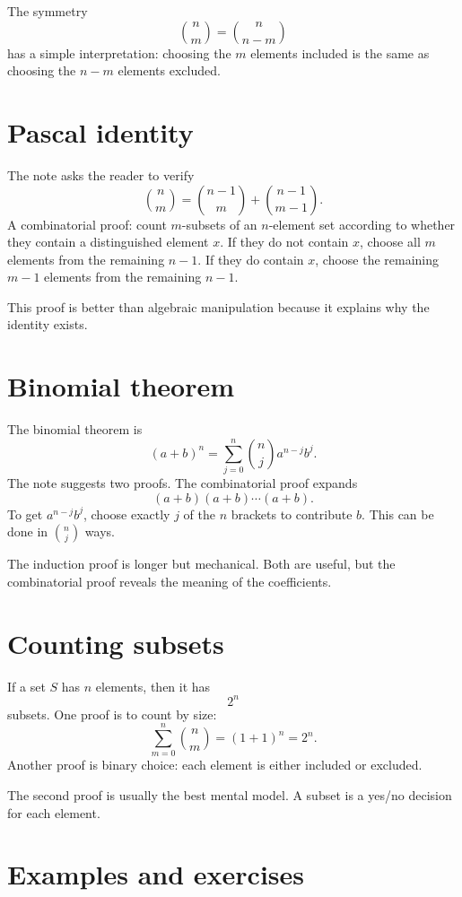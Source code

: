The symmetry
\[
  \binom nm=\binom n{n-m}
\]
has a simple interpretation: choosing the \(m\) elements included is the same as choosing the \(n-m\) elements excluded.

\section{Pascal identity}

The note asks the reader to verify
\[
  \binom nm=\binom{n-1}{m}+\binom{n-1}{m-1}.
\]
A combinatorial proof: count \(m\)-subsets of an \(n\)-element set according to whether they contain a distinguished element \(x\).  If they do not contain \(x\), choose all \(m\) elements from the remaining \(n-1\).  If they do contain \(x\), choose the remaining \(m-1\) elements from the remaining \(n-1\).

This proof is better than algebraic manipulation because it explains why the identity exists.

\section{Binomial theorem}

The binomial theorem is
\[
  (a+b)^n=\sum_{j=0}^n\binom nj a^{n-j}b^j.
\]
The note suggests two proofs.  The combinatorial proof expands
\[
  (a+b)(a+b)\cdots(a+b).
\]
To get \(a^{n-j}b^j\), choose exactly \(j\) of the \(n\) brackets to contribute \(b\).  This can be done in \(\binom nj\) ways.

The induction proof is longer but mechanical.  Both are useful, but the combinatorial proof reveals the meaning of the coefficients.

\section{Counting subsets}

If a set \(S\) has \(n\) elements, then it has
\[
  2^n
\]
subsets.  One proof is to count by size:
\[
  \sum_{m=0}^n\binom nm=(1+1)^n=2^n.
\]
Another proof is binary choice: each element is either included or excluded.

The second proof is usually the best mental model.  A subset is a yes/no decision for each element.

\section{Examples and exercises}

